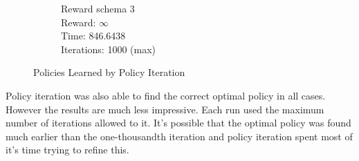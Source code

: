 \documentclass[a4paper,10pt]{article}
\begin{document}
\begin{figure}[H]
\begin{subfigure}[b]{0.3\textwidth}
                \caption{Reward schema 3\\
                Reward: $\infty$ \\
                Time: 846.6438\\
                Iterations: 1000 (max)}
                \label{fig:mouse}
        \end{subfigure}
        \caption{Policies Learned by Policy Iteration}\label{fig:animals}
\end{figure}

Policy iteration was also able to find the correct optimal policy in all cases. However the results are much less impressive. Each run used the maximum number of iterations allowed to it. It's possible that the optimal policy was found much earlier than the one-thousandth iteration and policy iteration spent most of it's time trying to refine this.
\end{document}
